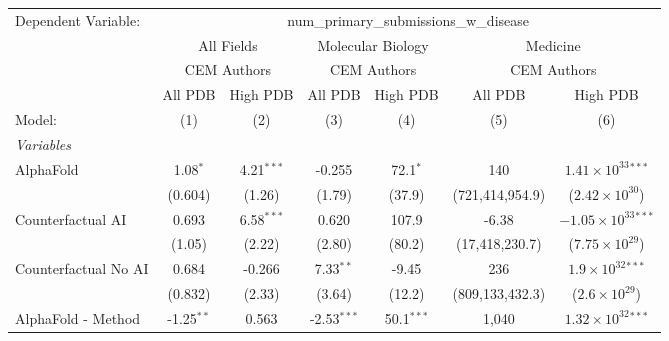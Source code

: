 \begingroup
\centering
\begin{tabular}{lcccccc}
   \tabularnewline \midrule \midrule
   Dependent Variable: & \multicolumn{6}{c}{num\_primary\_submissions\_w\_disease}\\
 & \multicolumn{2}{c}{All Fields} & \multicolumn{2}{c}{Molecular Biology} & \multicolumn{2}{c}{Medicine} \\
\cmidrule(lr){2-3} \cmidrule(lr){4-5} \cmidrule(lr){6-7}
 & \multicolumn{2}{c}{CEM Authors} & \multicolumn{2}{c}{CEM Authors} & \multicolumn{2}{c}{CEM Authors} \\
\cmidrule(lr){2-3} \cmidrule(lr){4-5} \cmidrule(lr){6-7}
 & \multicolumn{1}{c}{All PDB} & \multicolumn{1}{c}{High PDB} & \multicolumn{1}{c}{All PDB} & \multicolumn{1}{c}{High PDB} & \multicolumn{1}{c}{All PDB} & \multicolumn{1}{c}{High PDB} \\
\cmidrule(lr){2-2} \cmidrule(lr){3-3} \cmidrule(lr){4-4} \cmidrule(lr){5-5} \cmidrule(lr){6-6} \cmidrule(lr){7-7}
   Model:                                                     & (1)           & (2)           & (3)           & (4)          & (5)             & (6)\\  
   \midrule
   \emph{Variables}\\
   AlphaFold                                                  & 1.08$^{*}$    & 4.21$^{***}$  & -0.255        & 72.1$^{*}$   & 140             & $1.41\times 10^{33}$$^{***}$\\    
                                                              & (0.604)       & (1.26)        & (1.79)        & (37.9)       & (721,414,954.9) & ($2.42\times 10^{30}$)\\    
   Counterfactual AI                                          & 0.693         & 6.58$^{***}$  & 0.620         & 107.9        & -6.38           & $-1.05\times 10^{33}$$^{***}$\\    
                                                              & (1.05)        & (2.22)        & (2.80)        & (80.2)       & (17,418,230.7)  & ($7.75\times 10^{29}$)\\    
   Counterfactual No AI                                       & 0.684         & -0.266        & 7.33$^{**}$   & -9.45        & 236             & $1.9\times 10^{32}$$^{***}$\\    
                                                              & (0.832)       & (2.33)        & (3.64)        & (12.2)       & (809,133,432.3) & ($2.6\times 10^{29}$)\\    
   AlphaFold - Method                                         & -1.25$^{**}$  & 0.563         & -2.53$^{***}$ & 50.1$^{***}$ & 1,040           & $1.32\times 10^{32}$$^{***}$\\    

\end{tabular}
